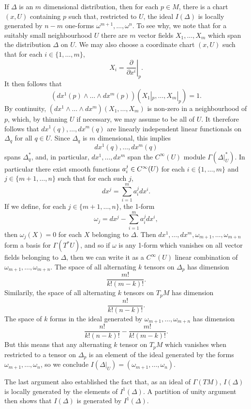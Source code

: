If $\Delta$ is an $m$ dimensional distribution, then for each $p \in M$, there is a chart $(x,U)$ containing $p$ such that, restricted to $U$, the ideal $I(\Delta)$ is locally generated by $n-m$ one-forms $\omega^{m+1}, \dots, \omega^n$. To see why, we note that for a suitably small neighbourhood $U$ there are $m$ vector fields $X_1, \dots, X_m$ which span the distribution $\Delta$ on $U$. We may also choose a coordinate chart $(x,U)$ such that for each $i \in \{ 1, \dots, m \}$,
%
\[ X_i = \left. \frac{\partial}{\partial x^i} \right|_p. \]
%
It then follows that
%
\[ \left( dx^1(p) \wedge \dots \wedge dx^m(p) \right) \left( X_1|_p, \dots, X_m|_p \right) = 1. \]
%
By continuity, $(dx^1 \wedge \dots \wedge dx^m)(X_1, \dots, X_m)$ is non-zero in a neighbourhood of $p$, which, by thinning $U$ if necessary, we may assume to be all of $U$. It therefore follows that $dx^1(q), \dots, dx^m(q)$ are linearly independent linear functionals on $\Delta_q$ for all $q \in U$. Since $\Delta_q$ is $m$ dimensional, this implies
%
\[ dx^1(q), \dots, dx^m(q) \]
%
spans $\Delta_q^*$, and, in particular, $dx^1, \dots, dx^m$ span the $C^\infty(U)$ module $\Gamma(\Delta|_U^*)$. In particular there exist smooth functions $\smash{a_i^j} \in C^\infty(U)$ for each $i \in \{ 1, \dots, m \}$ and $j \in \{ m+1, \dots, n \}$ such that for each such $j$,
%
\[ dx^j = \sum_{i = 1}^m a_i^j dx^i. \]
%
If we define, for each $j \in \{ m+1, \dots, n \}$, the 1-form
%
\[ \omega_j = dx^j - \sum_{i = 1}^m a_i^j dx^i, \]
%
then $\omega_j(X) = 0$ for each $X$ belonging to $\Delta$. Then $dx^1, \dots, dx^m, \omega_{m+1}, \dots, \omega_{m+n}$ form a basis for $\Gamma(T^*U)$, and so if $\omega$ is any 1-form which vanishes on all vector fields belonging to $\Delta$, then we can write it as a $C^\infty(U)$ linear combination of $\omega_{m+1}, \dots, \omega_{m+n}$. The space of all alternating $k$ tensors on $\Delta_p$ has dimension
%
\[ \frac{m!}{k!(m-k)!}. \]
%
Similarily, the space of all alternating $k$ tensors on $T_p M$ has dimension
%
\[ \frac{n!}{k!(n-k)!}. \]
%
The space of $k$ forms in the ideal generated by $\omega_{m+1}, \dots, \omega_{m+n}$ has dimension
%
\[ \frac{n!}{k!(n-k)!} - \frac{m!}{k!(m-k)!}. \]
%
But this means that any alternating $k$ tensor on $T_p M$ which vanishes when restricted to a tensor on $\Delta_p$ is an element of the ideal generated by the forms $\omega_{m+1}, \dots, \omega_n$, so we conclude $I(\Delta|_U) = (\omega_{m+1}, \dots, \omega_n)$.

\begin{remark}
    The last argument also established the fact that, as an ideal of $\Gamma(TM)$, $I(\Delta)$ is locally generated by the elements of $I^1(\Delta)$. A partition of unity argument then shows that $I(\Delta)$ is generated by $I^1(\Delta)$.
\end{remark}

